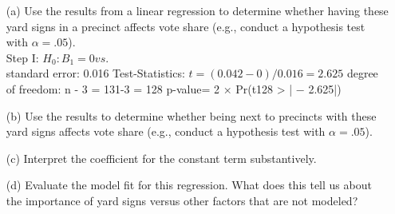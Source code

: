 \documentclass[12pt,letterpaper]{article}
\begin{document}
\vspace{.5cm}
\begin{enumerate}
	\item [(a)] Use the results from a linear regression to determine whether having these yard signs in a precinct affects vote share (e.g., conduct a hypothesis test with $\alpha = .05$).\\
	Step I: $ H_{0}: B_{1} = 0 vs.  $\\		
	standard error: 0.016
	Test-Statistics: $ t = (0.042-0) /0.016 = 2.625$
	degree of freedom: n - 3 = 131-3 = 128
	 p-value= 2 × Pr(t128 > | − 2.625|) 
	
	
	\newpage		
	\item [(b)]  Use the results to determine whether being
	next to precincts with these yard signs affects vote
	share (e.g., conduct a hypothesis test with $\alpha = .05$).
	
	\vspace{7cm}
	\item [(c)] Interpret the coefficient for the constant term substantively.
	\vspace{7cm}
	
	\item [(d)] Evaluate the model fit for this regression.  What does this	tell us about the importance of yard signs versus other factors that are not modeled?
	
\end{enumerate}  
\end{document}
